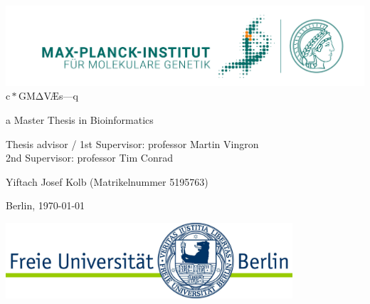\documentclass[11pt, a4paper]{report}
\theoremstyle{plain}
\theoremstyle{definition}
\theoremstyle{remark}
\newcommand{\scgmvae}{$\mathrm{c}{\ast}\mathrm{GM\Delta}$V{\AE}s---q}
\begin{document}
\begin{titlepage}
\begin{center}
{\includegraphics[width=1.0\textwidth]{images/MPIMG_RGB_gruen.png}}\\
\vspace*{1cm}
\Large
\scgmvae



\large
a Master Thesis in Bioinformatics
\vspace{1.0cm}

Thesis advisor / 1st Supervisor: professor Martin Vingron\\
2nd Supervisor: professor Tim Conrad

\vfill

Yiftach Josef Kolb
(Matrikelnummer 5195763)

Berlin, \today

\vfill
{\includegraphics[width=0.8\textwidth]{images/fu-logo_bildschirm_RGB1.jpg}}
\end{center}
\normalsize
\end{titlepage}

\end{document}
